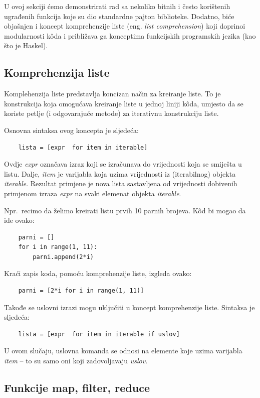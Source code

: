 U ovoj sekciji ćemo demonstrirati rad sa nekoliko bitnih i često korištenih ugrađenih funkcija koje su dio standardne pajton biblioteke. Dodatno, biće objašnjen i koncept komprehenzije liste (eng. \textit{list comprehension}) koji  doprinoi modularnosti k\^oda i približava ga konceptima funkcijskih programskih jezika (kao što je Haskel). 

\subsection{Komprehenzija liste}

Komplehenzija liste predstavlja koncizan način za kreiranje liste. To je konstrukcija koja omogućava kreiranje liste u jednoj liniji k\^oda, umjesto da se koriste petlje (i odgovarajuće metode) za iterativnu konstrukciju liste.

Osnovna sintaksa ovog koncepta je sljedeća:

\begin{verbatim}
	lista = [expr  for item in iterable]
\end{verbatim}
Ovdje \textit{expr} označava izraz koji se izračunava do vrijednosti koja se smiješta u listu.
Dalje, \textit{item} je varijabla koja  uzima vrijednosti iz (iterabilnog) objekta \textit{iterable}.  Rezultat primjene je nova lista sastavljena od  vrijednosti dobivenih primjenom izraza  \textit{expr} na svaki elemenat objekta \textit{iterable}.

Npr.\ recimo da želimo kreirati listu prvih 10 parnih brojeva. K\^od bi mogao da ide ovako:

\begin{verbatim}
	parni = []
	for i in range(1, 11):
	    parni.append(2*i)
\end{verbatim}

Kraći zapis koda, pomoću komprehenzije liste, izgleda ovako:


\begin{verbatim}
	parni = [2*i for i in range(1, 11)]
\end{verbatim}
Takođe se  uslovni izrazi  mogu uključiti u koncept komprehenzije liste. Sintaksa je sljedeća:

\begin{verbatim}
	lista = [expr  for item in iterable if uslov]
\end{verbatim}
U ovom slučaju, uslovna komanda se odnosi na elemente koje uzima varijabla \textit{item} -- to su samo oni koji zadovoljavaju \textit{uslov}. 

\subsection{Funkcije map, filter, reduce}

